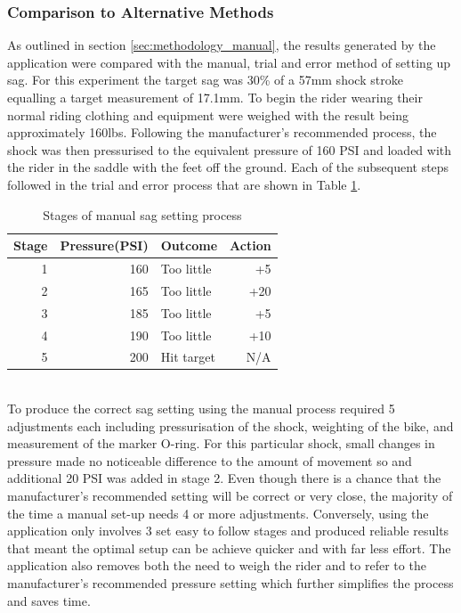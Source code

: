 		\subsubsection{Comparison to Alternative Methods}
			As outlined in section \ref{sec:methodology_manual}, the results generated by the application were compared with the manual, trial and error method of setting up sag. For this experiment the target sag was 30\% of a 57mm shock stroke equalling a target measurement of 17.1mm. To begin the rider wearing their normal riding clothing and equipment were weighed with  the result  being  approximately 160lbs. Following the manufacturer’s recommended process, the shock was then pressurised to the equivalent pressure of 160 PSI and loaded  with the  rider in the saddle with the feet off the ground. Each of the subsequent steps followed in the trial and error process that are shown in Table \ref{tab:manual_process}.
			\begin{table}[h!]
				\centering
				\caption{Stages of manual sag setting process}
				\label{tab:manual_process}
				\begin{tabular}{|r|r|l|r|}
					\hline
					\bfseries Stage&\bfseries Pressure(PSI)&\bfseries Outcome&\bfseries Action\\
					\hline
					1&160&Too little&+5\\
					2&165&Too little&+20\\
					3&185&Too little&+5\\
					4&190&Too little&+10\\
					5&200&Hit target&N/A\\
					\hline
				\end{tabular}
			\end{table}\\
			To produce the correct sag setting using the manual process required 5 adjustments each including pressurisation of the shock, weighting of the bike, and measurement of the marker O-ring. For this particular shock, small changes in pressure made no noticeable difference to the amount of movement so and additional  20 PSI was added in stage 2. Even though there is a chance that the manufacturer’s recommended setting will be correct or very close, the majority of the time a manual set-up  needs 4 or more  adjustments. Conversely, using the  application only involves  3 set easy to follow stages and produced reliable results that meant the optimal setup can be achieve quicker and with far less effort. The application also removes both the need to  weigh the rider and to refer to the manufacturer’s recommended pressure setting which further simplifies the process and saves time. 
